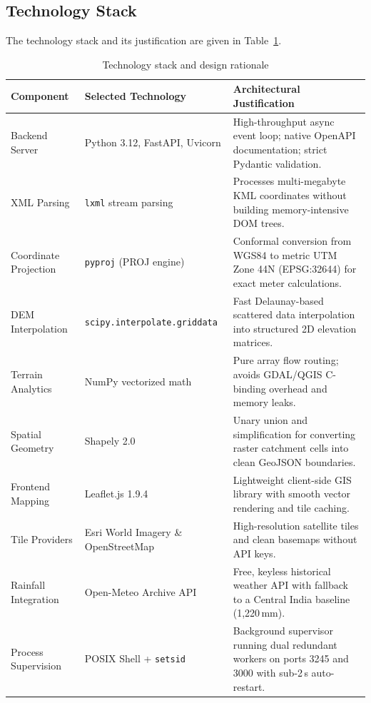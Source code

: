 \documentclass[manuscript,screen,review]{acmart}
\begin{document}
\subsection{Technology Stack}
The technology stack and its justification are given in Table~\ref{tab:tech-stack}.

\begin{table}[!ht]
\small
  \caption{Technology stack and design rationale}
  \label{tab:tech-stack}
  \begin{tabular}{p{3.2cm}p{3.5cm}p{6.8cm}}
    \toprule
    \textbf{Component} & \textbf{Selected Technology} & \textbf{Architectural Justification} \\
    \midrule
    Backend Server & Python 3.12, FastAPI, Uvicorn & High-throughput async event loop; native OpenAPI documentation; strict Pydantic validation. \\
    XML Parsing & \texttt{lxml} stream parsing & Processes multi-megabyte KML coordinates without building memory-intensive DOM trees. \\
    Coordinate Projection & \texttt{pyproj} (PROJ engine) & Conformal conversion from WGS84 to metric UTM Zone 44N (EPSG:32644) for exact meter calculations. \\
    DEM Interpolation & \texttt{scipy.interpolate.griddata} & Fast Delaunay-based scattered data interpolation into structured 2D elevation matrices. \\
    Terrain Analytics & NumPy vectorized math & Pure array flow routing; avoids GDAL/QGIS C-binding overhead and memory leaks. \\
    Spatial Geometry & Shapely 2.0 & Unary union and simplification for converting raster catchment cells into clean GeoJSON boundaries. \\
    Frontend Mapping & Leaflet.js 1.9.4 & Lightweight client-side GIS library with smooth vector rendering and tile caching. \\
    Tile Providers & Esri World Imagery \& OpenStreetMap & High-resolution satellite tiles and clean basemaps without API keys. \\
    Rainfall Integration & Open-Meteo Archive API & Free, keyless historical weather API with fallback to a Central India baseline (1,220\,mm). \\
    Process Supervision & POSIX Shell + \texttt{setsid} & Background supervisor running dual redundant workers on ports 3245 and 3000 with sub-2\,s auto-restart. \\
    \bottomrule
  \end{tabular}
\end{table}
\end{document}
